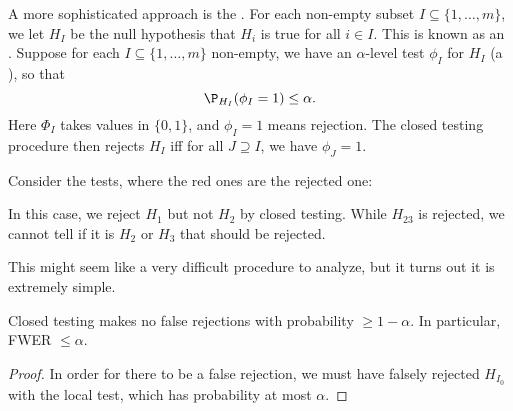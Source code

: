 \documentclass[a4paper]{article}
\begin{document}
A more sophisticated approach is the . For each non-empty subset $I \subseteq \{1, \ldots, m\}$, we let $H_I$ be the null hypothesis that $H_i$ is true for all $i \in I$. This is known as an . Suppose for each $I \subseteq \{1, \ldots, m\}$ non-empty, we have an $\alpha$-level test $\phi_I$ for $H_I$ (a ), so that
\[
  \P_{H_I}(\phi_I = 1) \leq \alpha.
\]
Here $\Phi_I$ takes values in $\{0, 1\}$, and $\phi_I = 1$ means rejection. The closed testing procedure then rejects $H_I$ iff for all $J \supseteq I$, we have $\phi_J = 1$.

\begin{eg}
  Consider the tests, where the red ones are the rejected one:
  \begin{center}
  \end{center}
  In this case, we reject $H_1$ but not $H_2$ by closed testing. While $H_{23}$ is rejected, we cannot tell if it is $H_2$ or $H_3$ that should be rejected.
\end{eg}

This might seem like a very difficult procedure to analyze, but it turns out it is extremely simple.
\begin{thm}
  Closed testing makes no false rejections with probability $\geq 1 - \alpha$. In particular, FWER $\leq \alpha$.
\end{thm}

\begin{proof}
  In order for there to be a false rejection, we must have falsely rejected $H_{I_0}$ with the local test, which has probability at most $\alpha$.
\end{proof}
\end{document}
